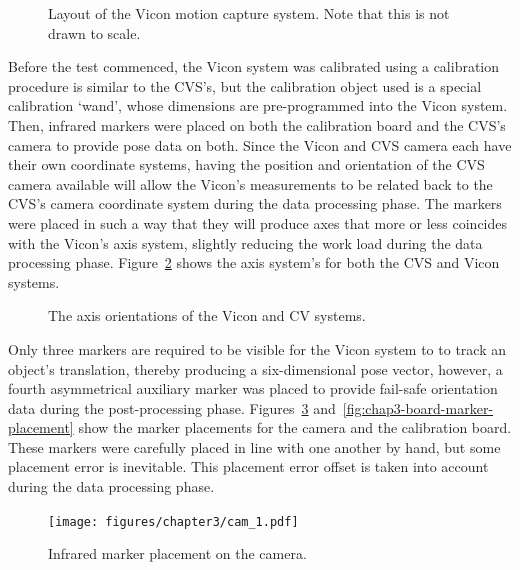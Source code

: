\begin{figure}
  \centering
  \def\svgwidth{0.5\textwidth}
  
  \caption[Layout of the Vicon motion capture system.]{Layout of the Vicon motion capture system. Note that this is not drawn to scale.}
\label{fig:chap3-vicon-layout}
\end{figure}

Before the test commenced, the Vicon system was calibrated using a calibration procedure is similar to the CVS's, but the calibration object used is a special calibration `wand', whose dimensions are pre-programmed into the Vicon system. Then, infrared markers were placed on both the calibration board and the CVS's camera to provide pose data on both. Since the Vicon and CVS camera each have their own coordinate systems, having the position and orientation of the CVS camera available will allow the Vicon's measurements to be related back to the CVS's camera coordinate system during the data processing phase. The markers were placed in such a way that they will produce axes that more or less coincides with the Vicon's axis system, slightly reducing the work load during the data processing phase. Figure~\ref{fig:chap3-cam-vicon-axes} shows the axis system's for both the CVS and Vicon systems.

\begin{figure}
  \centering
  \def\svgwidth{0.5\textwidth}
  
  \caption{The axis orientations of the Vicon and CV systems.}
\label{fig:chap3-cam-vicon-axes}
\end{figure}

Only three markers are required to be visible for the Vicon system to to track an object's translation, thereby producing a six-dimensional pose vector, however, a fourth asymmetrical auxiliary marker was placed to provide fail-safe orientation data during the post-processing phase. Figures~\ref{fig:chap3-cam-marker-placement} and~\ref{fig:chap3-board-marker-placement} show the marker placements for the camera and the calibration board. These markers were carefully placed in line with one another by hand, but some placement error is inevitable. This placement error offset is taken into account during the data processing phase. 

\begin{figure}
   \centering 
   \texttt{[image: figures/chapter3/cam\_1.pdf]}
   \caption{Infrared marker placement on the camera.}
\label{fig:chap3-cam-marker-placement}
\end{figure}

